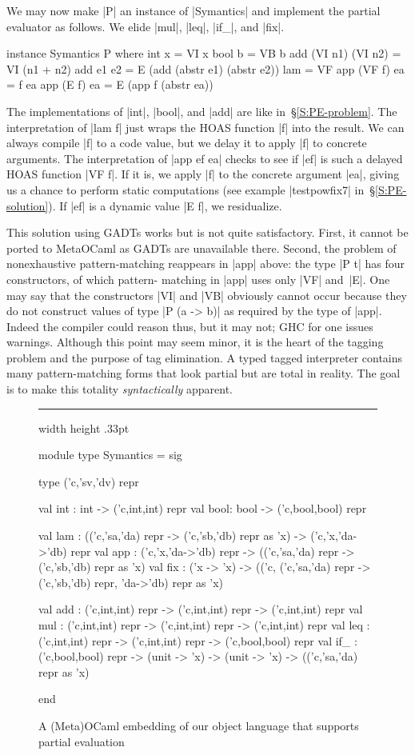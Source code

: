 \documentclass[preprint]{sigplanconf}
\newenvironment{floatrule}
    {\hrule width \hsize height .33pt \vspace{.5pc}}
    {\par\addvspace{1ex}}
\begin{document}
We may now make |P| an instance of
|Symantics| and implement the partial evaluator as follows. We elide
|mul|, |leq|, |if_|, and |fix|.
\begin{code}
instance Symantics P where
  int x  = VI x
  bool b = VB b
  add (VI n1) (VI n2) = VI (n1 + n2)
  add e1 e2 = E (add (abstr e1) (abstr e2))
  lam = VF
  app (VF f) ea = f ea
  app (E f)  ea = E (app f (abstr ea))
\end{code}
The implementations of |int|, |bool|, and |add| are like
in~\S\ref{S:PE-problem}.
The interpretation of |lam f| just wraps the
HOAS function |f| into the result. We can always compile |f| to a code value,
but we delay it to apply |f| to concrete arguments. The interpretation of
|app ef ea| checks to see if |ef| is such a delayed
HOAS function |VF f|. If it is, we apply |f| to the
concrete argument |ea|, giving us a chance to perform static
computations (see example |testpowfix7| in~\S\ref{S:PE-solution}). If |ef| is a
dynamic value |E f|, we residualize.

This solution using GADTs works but is not quite satisfactory. First, it
cannot be ported to MetaOCaml as GADTs are unavailable there.  Second,
the problem of nonexhaustive pattern\hyp matching reappears in |app|
above: the type |P t| has four constructors, of which pattern\hyp
matching in |app| uses only |VF| and~|E|. One may say that the
constructors |VI| and |VB| obviously cannot occur because they do not
construct values of type |P (a -> b)| as required by the type of |app|.
Indeed the compiler could reason thus, but it may not; GHC for one
issues warnings.  Although this point may seem minor, it is the heart of
the tagging problem and the purpose of tag elimination. A typed tagged
interpreter contains many pattern\hyp matching forms that look partial
but are total in reality. The goal is to make this totality
\emph{syntactically} apparent.

\begin{figure*}
\begin{floatrule}
\begin{code}
module type Symantics = sig

  type ('c,'sv,'dv) repr

  val int : int  -> ('c,int,int) repr
  val bool: bool -> ('c,bool,bool) repr

  val lam : (('c,'sa,'da) repr -> ('c,'sb,'db) repr as 'x) -> ('c,'x,'da->'db) repr
  val app : ('c,'x,'da->'db) repr -> (('c,'sa,'da) repr -> ('c,'sb,'db) repr as 'x)
  val fix : ('x -> 'x) -> (('c, ('c,'sa,'da) repr -> ('c,'sb,'db) repr, 'da->'db) repr as 'x)

  val add : ('c,int,int) repr -> ('c,int,int) repr -> ('c,int,int) repr
  val mul : ('c,int,int) repr -> ('c,int,int) repr -> ('c,int,int) repr
  val leq : ('c,int,int) repr -> ('c,int,int) repr -> ('c,bool,bool) repr
  val if_ : ('c,bool,bool) repr -> (unit -> 'x) -> (unit -> 'x) -> (('c,'sa,'da) repr as 'x)

end
\end{code}
\end{floatrule}
\caption{A (Meta)OCaml embedding of our object language that supports partial evaluation}
\label{fig:ocaml}
\end{figure*}
\end{document}
